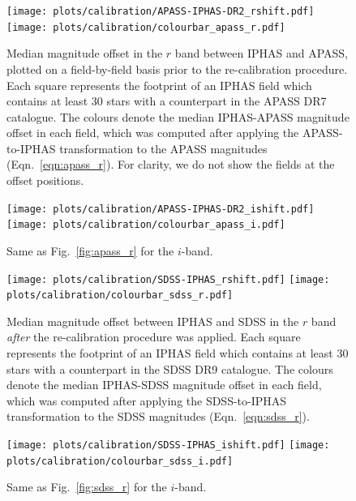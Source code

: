 \documentclass[useAMS,usenatbib]{mn2e}
\begin{document}
\begin{figure}
    \texttt{[image: plots/calibration/APASS-IPHAS-DR2\_rshift.pdf]} 
    \texttt{[image: plots/calibration/colourbar\_apass\_r.pdf]} 
    \caption{Median magnitude offset in the $r$ band between IPHAS and APASS,
             plotted on a field-by-field basis
             prior to the re-calibration procedure.
             Each square represents the footprint of an IPHAS field
             which contains at least 30 stars with a counterpart
             in the APASS DR7 catalogue.
             The colours denote the median
             IPHAS-APASS magnitude offset in each field,
             which was computed after applying the APASS-to-IPHAS
             transformation to the APASS magnitudes (Eqn.~\ref{eqn:apass_r}).
             For clarity, we do not show the fields at the offset positions.}
        \label{fig:apass_r}
    \vspace{1cm}
    \texttt{[image: plots/calibration/APASS-IPHAS-DR2\_ishift.pdf]} 
    \texttt{[image: plots/calibration/colourbar\_apass\_i.pdf]} 
    \caption{Same as Fig.~\ref{fig:apass_r} for the $i$-band.}
    \label{fig:apass_i}
\end{figure}

\begin{figure}
    \texttt{[image: plots/calibration/SDSS-IPHAS\_rshift.pdf]}
    \texttt{[image: plots/calibration/colourbar\_sdss\_r.pdf]} 
    \caption{Median magnitude offset between IPHAS and SDSS in the $r$ band
             \emph{after} the re-calibration procedure was applied.
             Each square represents the footprint of an IPHAS field
             which contains at least 30 stars
             with a counterpart in the SDSS DR9 catalogue.
             The colours denote the median IPHAS-SDSS magnitude offset
             in each field,
             which was computed after applying the SDSS-to-IPHAS
             transformation to the SDSS magnitudes (Eqn.~\ref{eqn:sdss_r}).}
    \label{fig:sdss_r}
    \vspace{1cm}
    \texttt{[image: plots/calibration/SDSS-IPHAS\_ishift.pdf]}
    \texttt{[image: plots/calibration/colourbar\_sdss\_i.pdf]} 
    \caption{Same as Fig.~\ref{fig:sdss_r} for the $i$-band.}
    \label{fig:sdss_i}
\end{figure}
\end{document}

